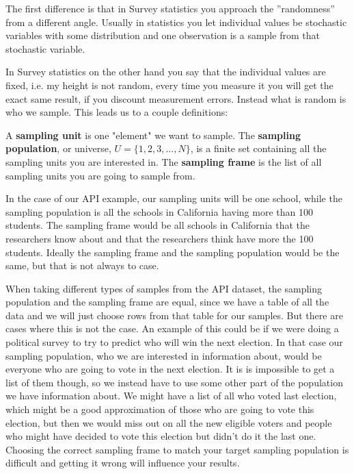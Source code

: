 \documentclass{article}
\begin{document}
The first difference is that in Survey statistics you approach the ''randomness'' from a different angle.
Usually in statistics you let individual values be stochastic variables
with some distribution and one observation is a sample from that stochastic
variable.

In Survey statistics on the other hand you say that the individual values are
fixed, i.e. my height is not random, every time you measure it you will get the
exact same result, if you discount measurement errors. Instead what is random is
who we sample. This leads us to a couple definitions:

\begin{definition} \label{def:sampUnitPopFrame}
  A \textbf{sampling unit} is one "element" we want to sample.
  The \textbf{sampling population}, or universe, \(U = \{1, 2, 3, ..., N\}\), is a
  finite set containing all the sampling units you are interested in. 
  The \textbf{sampling frame} is the list of all sampling units you are going to sample from. 
\end{definition}

In the case of our API example, our sampling units will be one school, while
the sampling population is all the schools in California having more than 100 students.
The sampling frame would be all schools in California that the researchers know
about and that the researchers think have more the 100 students.
Ideally the sampling frame and the sampling population would be the same, but that is not always to case.

When taking different types of samples from the API dataset, the sampling population and the sampling frame are equal, since
we have a table of all the data and we will just choose rows from that table for
our samples. But there are cases where this is not the case. An example of this
could be if we were doing a political survey to try to predict who will win the
next election.
In that case our sampling population, who we are interested in information
about, would be everyone who are going to vote in the next election. It is
is impossible to get a list of them though, so we instead have to use 
some other part of the population we have information about. We might have a
list of all who voted last election, which might be a good approximation of
those who are going to vote this election, but then we would miss out on all the
new eligible voters and people who might have decided to vote this election but
didn't do it the last one.
Choosing the correct sampling frame to match your target sampling population is
difficult and getting it wrong will influence your results.
\end{document}
